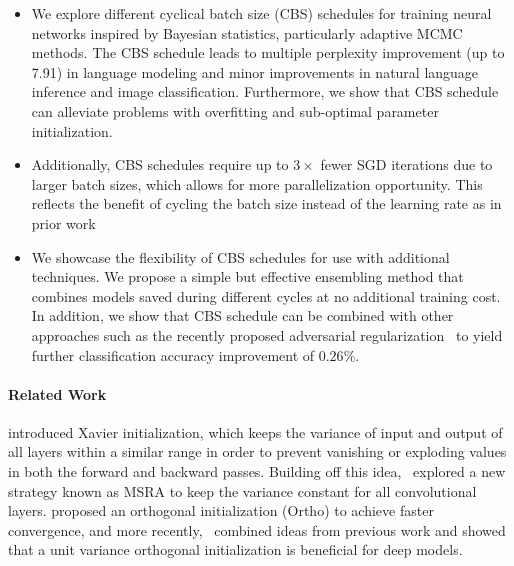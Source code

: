 \begin{itemize}
    \item We explore different cyclical batch size (CBS) schedules for training neural networks
    inspired by Bayesian statistics, particularly adaptive MCMC methods. The CBS schedule leads to multiple perplexity improvement (up to 7.91) in language modeling and minor improvements in natural language inference and image classification. 
    Furthermore, we show that CBS schedule can alleviate problems with overfitting and sub-optimal parameter initialization.
     
     \item Additionally, CBS schedules require up to $3\times$ fewer SGD iterations due to larger batch sizes, which allows for
     more parallelization opportunity. This reflects the benefit of cycling the batch size instead
     of the learning rate as in prior work~\citep{smith2017don, huang2017snapshot}
     
     \item We showcase the flexibility of CBS schedules for use with additional techniques. We propose a simple but effective ensembling method that combines models saved during different
     cycles at no additional training cost. 
     In addition, we show that CBS schedule can be combined with other approaches such as the recently proposed adversarial regularization~\cite{yao2018large} to yield further classification accuracy improvement of $0.26\%$.

\end{itemize}

\paragraph{Related Work} 
\cite{glorot2010understanding} introduced Xavier initialization, which keeps the variance of
input and output of all layers within a similar range in order to prevent vanishing or 
exploding values in both the forward and backward passes. Building off this 
idea,~\cite{he2015delving} explored a new strategy known as MSRA to keep the 
variance constant for all convolutional layers. \cite{saxe2013exact} proposed an 
orthogonal initialization (Ortho) to achieve faster convergence, 
and more recently,~\cite{mishkin2015all} combined ideas from previous work and showed 
that a unit variance orthogonal initialization is beneficial for deep models.

